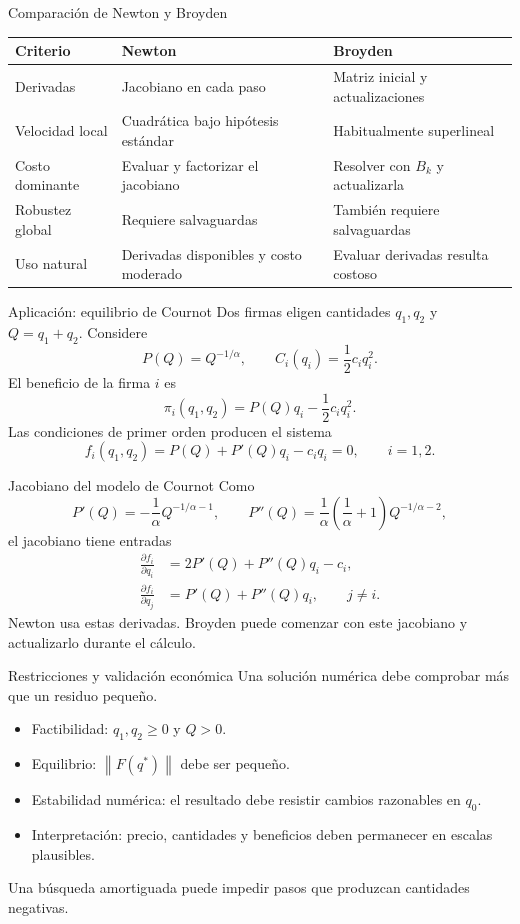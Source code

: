 \documentclass[aspectratio=169,12pt]{beamer}
\newcommand{\norm}[1]{\left\lVert#1\right\rVert}
\begin{document}
\begin{frame}{Comparación de Newton y Broyden}
\centering
\small
\begin{tabular}{p{2.6cm}p{3.2cm}p{3.2cm}}
\toprule
Criterio & Newton & Broyden \\
\midrule
Derivadas & Jacobiano en cada paso & Matriz inicial y actualizaciones \\
Velocidad local & Cuadrática bajo hipótesis estándar & Habitualmente superlineal \\
Costo dominante & Evaluar y factorizar el jacobiano & Resolver con $B_k$ y actualizarla \\
Robustez global & Requiere salvaguardas & También requiere salvaguardas \\
Uso natural & Derivadas disponibles y costo moderado & Evaluar derivadas resulta costoso \\
\bottomrule
\end{tabular}
\normalsize
\end{frame}

\begin{frame}{Aplicación: equilibrio de Cournot}
Dos firmas eligen cantidades $q_1,q_2$ y $Q=q_1+q_2$. Considere
\[
P(Q)=Q^{-1/\alpha},
\qquad
C_i(q_i)=\frac12c_iq_i^2.
\]
El beneficio de la firma $i$ es
\[
\pi_i(q_1,q_2)=P(Q)q_i-\frac12c_iq_i^2.
\]
Las condiciones de primer orden producen el sistema
\[
f_i(q_1,q_2)=P(Q)+P'(Q)q_i-c_iq_i=0,
\qquad i=1,2.
\]
\end{frame}

\begin{frame}{Jacobiano del modelo de Cournot}
Como
\[
P'(Q)=-\frac1\alpha Q^{-1/\alpha-1},
\qquad
P''(Q)=\frac1\alpha\left(\frac1\alpha+1\right)Q^{-1/\alpha-2},
\]
el jacobiano tiene entradas
\[
\begin{aligned}
\frac{\partial f_i}{\partial q_i}
&=2P'(Q)+P''(Q)q_i-c_i,\\
\frac{\partial f_i}{\partial q_j}
&=P'(Q)+P''(Q)q_i,
\qquad j\neq i.
\end{aligned}
\]
Newton usa estas derivadas. Broyden puede comenzar con este jacobiano y
actualizarlo durante el cálculo.
\end{frame}

\begin{frame}{Restricciones y validación económica}
Una solución numérica debe comprobar más que un residuo pequeño.
\begin{itemize}
  \item Factibilidad: $q_1,q_2\geq0$ y $Q>0$.
  \item Equilibrio: $\norm{F(q^*)}$ debe ser pequeño.
  \item Estabilidad numérica: el resultado debe resistir cambios razonables en $q_0$.
  \item Interpretación: precio, cantidades y beneficios deben permanecer en escalas plausibles.
\end{itemize}
Una búsqueda amortiguada puede impedir pasos que produzcan cantidades negativas.
\end{frame}
\end{document}
